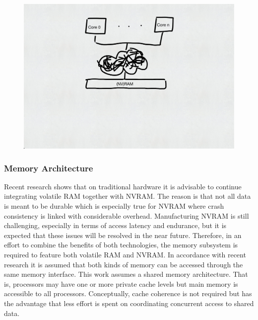 \begin{figure}
    \centering
    \includegraphics[scale=0.5]{figures/drafts/concept-sys-cpu.pdf}
    \caption{}
    \label{fig:concept-sys-cpu}
\end{figure}

\subsubsection{Memory Architecture}

Recent research shows that on traditional hardware it is advisable to continue
integrating volatile \ac{RAM} together with \ac{NVRAM}. The reason is that not
all data is meant to be durable which is especially true for \ac{NVRAM} where
crash consistency is linked with considerable overhead. Manufacturing \ac{NVRAM}
is still challenging, especially in terms of access latency and endurance, but
it is expected that these issues will be resolved in the near future. Therefore,
in an effort to combine the benefits of both technologies, the memory subsystem
is required to feature both volatile \ac{RAM} and \ac{NVRAM}. In accordance with
recent research it is assumed that both kinds of memory can be accessed through
the same memory interface. This work assumes a shared memory architecture. That
is, processors may have one or more private cache levels but main memory is
accessible to all processors. Conceptually, cache coherence is not required but
has the advantage that less effort is spent on coordinating concurrent access to
shared data.

